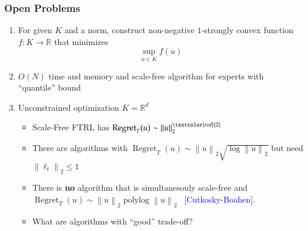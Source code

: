 \documentclass[usenames,dvipsnames]{beamer}
\DeclareMathOperator{\Regret}{Regret}
\DeclareMathOperator{\polylog}{polylog}
\newcommand{\R}{\mathbb{R}}
\newcommand{\norm}[1]{\left\|#1\right\|}
\newcommand{\Cite}[1]{{\tiny \textcolor{Blue}{[#1]}}}
\begin{document}
\begin{frame}
\frametitle{Open Problems}

\begin{enumerate}
\item For given $K$ and a norm, construct non-negative $1$-strongly convex
function $f:K \to \R$ that minimizes
$$
\sup_{u \in K} f(u)
$$

\item $O(N)$ time and memory and scale-free algorithm
for experts with ``quantile'' bound

\item Unconstrained optimization $K=\R^d$

\begin{itemize}
\item Scale-Free FTRL has $\Regret_T(u) \sim \norm{u}_2^{\textcolor{red}{2}}$
\item There are algorithms with $\Regret_T(u) \sim \norm{u}_2 \sqrt{\log \norm{u}_2}$ but need $\norm{\ell_t}_2 \le 1$
\item There is \textbf{no} algorithm that is simultanesouly scale-free
and $\Regret_T(u) \sim \norm{u}_2 \polylog{\norm{u}_2}$ \ \Cite{Cutkosky-Boahen}.
\item What are algorithms with ``good'' trade-off?
\end{itemize}

\end{enumerate}

\end{frame}
\end{document}

